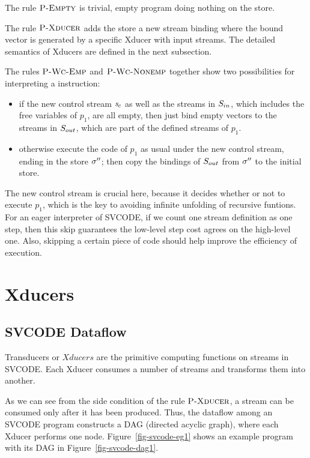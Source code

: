 The rule $\textsc{P-Empty}$ is trivial, empty program doing nothing on the store. 

The rule $\textsc{P-Xducer}$ adds the store a new stream binding where the bound vector is generated by a specific Xducer with input streams. The detailed semantics of Xducers are defined in the next subsection. 

The rules $\textsc{P-Wc-Emp}$ and $\textsc{P-Wc-Nonemp}$ together show two possibilities for interpreting a \wc instruction:
\begin{itemize}
	\item if the new control stream $\mathit{s}_c$ as well as the streams in $S_{in}$, which includes the free variables of $p_1$, are all empty, then just bind empty vectors to the streams in $S_{out}$, which are part of the defined streams of $p_1$.
	\item otherwise execute the code of $p_1$ as usual under the new control stream, ending in the store $\sigma''$; then copy the bindings of $S_{out}$ from $\sigma''$ to the initial store. 
\end{itemize}
The new control stream is crucial here, because it decides whether or not to execute $p_1$, which is the key to avoiding infinite unfolding of recursive funtions. For an eager interpreter of SVCODE, if we count one stream definition as one step, then this skip guarantees the low-level step cost agrees on the high-level one. Also, skipping a certain piece of code should help improve the efficiency of execution.



\section{Xducers}

\subsection{SVCODE Dataflow}
Transducers or $Xducers$ are the primitive computing functions on streams in SVCODE. Each Xducer consumes a number of streams and transforms them into another. 

As we can see from the side condition of the rule $\textsc{P-Xducer}$, a stream can be consumed only after it has been produced.
Thus, the dataflow among an SVCODE program constructs a DAG (directed acyclic graph), where each Xducer performs one node. 
Figure~\ref{fig-svcode-eg1} shows an example program with its DAG in Figure~\ref{fig-svcode-dag1}. \\


